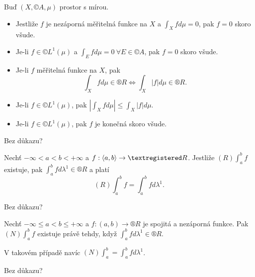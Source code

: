 \documentclass[12pt]{article}					%
\begin{document}
\begin{veta}
	Buď $(X, ©A, \mu)$ prostor s mírou.

	\begin{itemize}
		\item Jestliže $f$ je nezáporná měřitelná funkce na $X$ a $\int_X f d\mu = 0$, pak $f = 0$ skoro všude.
		\item Je-li $f \in ©L^1(\mu)$ a $\int_E f d\mu = 0\ \forall E \in ©A$, pak $f = 0$ skoro všude.
		\item Je-li $f$ měřitelná funkce na $X$, pak
			$$ \int_X f d\mu \in ®R \Leftrightarrow \int_X |f| d\mu \in ®R. $$
		\item Je-li $f \in ©L^1(\mu)$, pak $\left| \int_X f d\mu \right| ≤ \int_X |f| d\mu$.
		\item Je-li $f \in ©L^1(\mu)$, pak $f$ je konečná skoro všude.
	\end{itemize}

	\begin{dukazin}
		Bez důkazu?
	\end{dukazin}
\end{veta}

\begin{veta}
	Nechť $-∞ < a < b < +∞$ a $f: \<a, b\> \rightarrow ®R$. Jestliže $(R) \int_a^b f$ existuje, pak $\int_a^b f d\lambda^1 \in ®R$ a platí
	$$ (R) \int_a^b f = \int_a^b f d\lambda^1. $$

	\begin{dukazin}
		Bez důkazu?
	\end{dukazin}
\end{veta}

\begin{veta}
	Nechť $-∞ ≤ a < b ≤ +∞$ a $f: (a, b) \rightarrow ®R$ je spojitá a nezáporná funkce. Pak $(N) \int_a^b f$ existuje právě tehdy, když $\int_a^b f d\lambda^1 \in ®R$.
	
	V takovém případě navíc $(N) \int_a^b = \int_a^b f d\lambda^1$.

	\begin{dukazin}
		Bez důkazu?
	\end{dukazin}
\end{veta}

\end{document}
